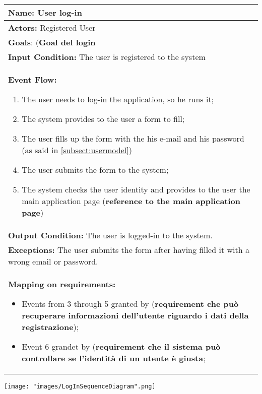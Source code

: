 \begin{tabular}{|p{14cm}|} \hline

\textbf{Name:} User log-in \\ \hline

\textbf{Actors:} Registered User \\ \hline

\textbf{Goals}: (\textbf{Goal del login} \\ \hline

\textbf{Input Condition:} The user is registered to the system \\ \hline

\textbf{Event Flow:} 

\begin{enumerate}
\item The user needs to log-in the application, so he runs it;
\item The system provides to the user a form to fill;
\item The user fills up the form with the his e-mail and his password (as said in \ref{subsect:usermodel})
\item The user submits the form to the system;
\item The system checks the user identity and provides to the user the main application page (\textbf{reference to the main application page})
\end{enumerate} \\ \hline

\textbf{Output Condition:} The user is logged-in to the system. \\ \hline

\textbf{Exceptions:} The user submits the form after having filled it with a wrong email or password. \\ \hline

\textbf{Mapping on requirements:}

\begin{itemize}
\item Events from 3 through 5 granted by (\textbf{requirement che può recuperare informazioni dell'utente riguardo i dati della registrazione});
\item Event 6 grandet by (\textbf{requirement che il sistema può controllare se l'identità di un utente è giusta};
\end{itemize} \\ \hline

\end{tabular}

\texttt{[image: "images/LogInSequenceDiagram".png]}

